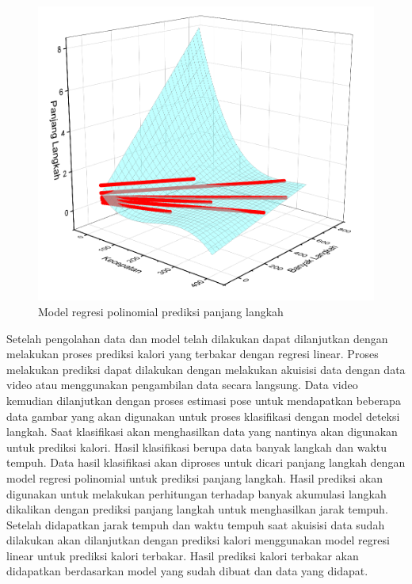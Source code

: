\begin{figure}[H]
  \centering
  \includegraphics[scale=0.5]{gambar/model regresi panjang.png}
  \caption{Model regresi polinomial prediksi panjang langkah}
  \label{fig:ModelRegresiPanjang}
\end{figure}

Setelah pengolahan data dan model telah dilakukan dapat dilanjutkan dengan melakukan proses prediksi kalori yang terbakar dengan regresi linear. Proses melakukan prediksi dapat dilakukan dengan melakukan akuisisi data dengan data video atau menggunakan pengambilan data secara langsung. Data video kemudian dilanjutkan dengan proses estimasi pose untuk mendapatkan beberapa data gambar yang akan digunakan untuk proses klasifikasi dengan model deteksi langkah. Saat klasifikasi akan menghasilkan data yang nantinya akan digunakan untuk prediksi kalori. Hasil klasifikasi berupa data banyak langkah dan waktu tempuh. Data hasil klasifikasi akan diproses untuk dicari panjang langkah dengan model regresi polinomial untuk prediksi panjang langkah. Hasil prediksi akan digunakan untuk melakukan perhitungan terhadap banyak akumulasi langkah dikalikan dengan prediksi panjang langkah untuk menghasilkan jarak tempuh. Setelah didapatkan jarak tempuh dan waktu tempuh saat akuisisi data sudah dilakukan akan dilanjutkan dengan prediksi kalori menggunakan model regresi linear untuk prediksi kalori terbakar. Hasil prediksi kalori terbakar akan didapatkan berdasarkan model yang sudah dibuat dan data yang didapat.


